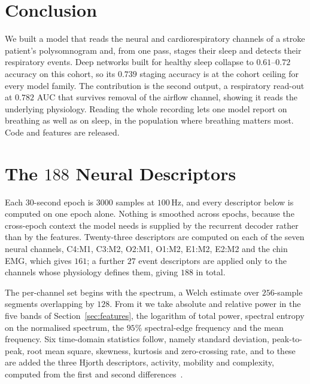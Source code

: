 \documentclass{ieeeaccess}
\newcommand{\mmAcc}{0.739}   %
\newcommand{\mmAuc}{0.782}   %
\begin{document}
\section{Conclusion}
We built a model that reads the neural and cardiorespiratory channels of a stroke patient's
polysomnogram and, from one pass,
stages their sleep and detects their respiratory events. Deep networks built for healthy sleep
collapse to $0.61$--$0.72$ accuracy on this cohort, so its $\mmAcc$ staging accuracy is at the
cohort ceiling for every model family. The contribution is the second output, a respiratory
read-out at $\mmAuc$ AUC that survives removal of the airflow channel, showing it reads the
underlying physiology. Reading the whole recording lets one model report on breathing as well
as on sleep, in the population where breathing matters most. Code and features are released.

\appendices
\section{The $188$ Neural Descriptors}
\label{app:features}
Each $30$-second epoch is $3000$ samples at $100$\,Hz, and every descriptor below is
computed on one epoch alone. Nothing is smoothed across epochs, because the
cross-epoch context the model needs is supplied by the recurrent decoder rather
than by the features. Twenty-three descriptors are computed on each of the seven
neural channels, C4:M1, C3:M2, O2:M1, O1:M2, E1:M2, E2:M2 and the chin EMG, which
gives $161$; a further $27$ event descriptors are applied only to the channels whose
physiology defines them, giving $188$ in total.

The per-channel set begins with the spectrum, a Welch estimate over $256$-sample
segments overlapping by $128$. From it we take absolute and relative power in the
five bands of Section~\ref{sec:features}, the logarithm of total power, spectral
entropy on the normalised spectrum, the $95\%$ spectral-edge frequency and the mean
frequency. Six time-domain statistics follow, namely standard deviation,
peak-to-peak, root mean square, skewness, kurtosis and zero-crossing rate, and to
these are added the three Hjorth descriptors, activity, mobility and complexity,
computed from the first and second differences~\cite{hjorth1970eeg}.
\end{document}
